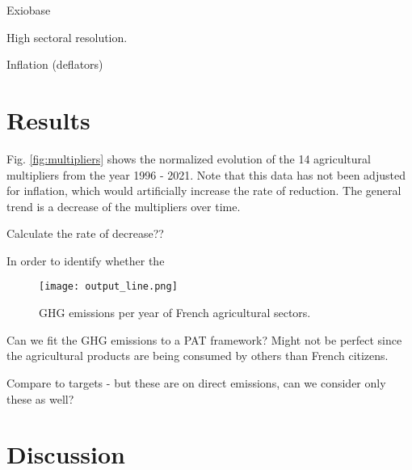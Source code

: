 \documentclass[a4paper,twoside]{article}
\begin{document}
Exiobase

High sectoral resolution.

Inflation (deflators)

\section{Results}

Fig. \ref{fig:multipliers} shows the normalized evolution of the 14 agricultural multipliers from the year 1996 - 2021. Note that this data has not been adjusted for inflation, which would artificially increase the rate of reduction. The general trend is a decrease of the multipliers over time.

Calculate the rate of decrease??

In order to identify whether the 

\begin{figure}[H]
\centering
\texttt{[image: output\_line.png]}
\caption{GHG emissions per year of French agricultural sectors.}\label{fig:GHG} 
\end{figure}

Can we fit the GHG emissions to a PAT framework? Might not be perfect since the agricultural products are being consumed by others than French citizens.

Compare to targets - but these are on direct emissions, can we consider only these as well?

\section{Discussion}


\end{document}

